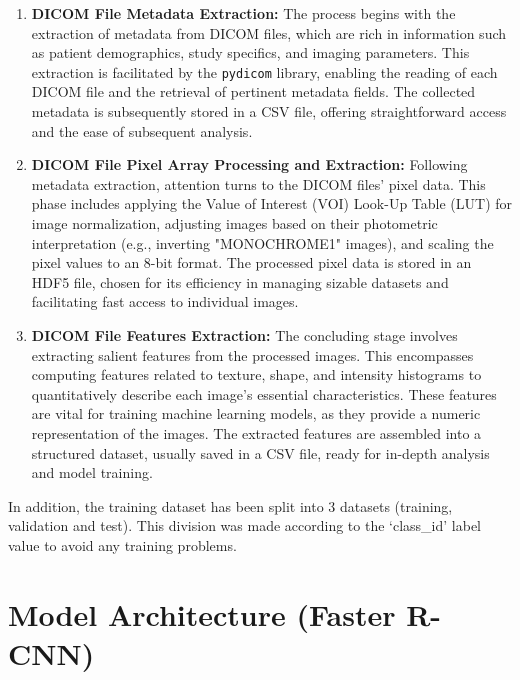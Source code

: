 \documentclass[12pt,oneside]{book} %
\begin{document}
\begin{enumerate}
    \item \textbf{DICOM File Metadata Extraction:}
          The process begins with the extraction of metadata from DICOM files, which are
          rich in information such as patient demographics, study specifics, and imaging
          parameters. This extraction is facilitated by the \texttt{pydicom} library,
          enabling the reading of each DICOM file and the retrieval of pertinent metadata
          fields. The collected metadata is subsequently stored in a CSV file, offering
          straightforward access and the ease of subsequent analysis.

    \item \textbf{DICOM File Pixel Array Processing and Extraction:}
          Following metadata extraction, attention turns to the DICOM files' pixel data.
          This phase includes applying the Value of Interest (VOI) Look-Up Table (LUT)
          for image normalization, adjusting images based on their photometric
          interpretation (e.g., inverting "MONOCHROME1" images), and scaling the pixel
          values to an 8-bit format. The processed pixel data is stored in an HDF5 file,
          chosen for its efficiency in managing sizable datasets and facilitating fast
          access to individual images.

    \item \textbf{DICOM File Features Extraction:}
          The concluding stage involves extracting salient features from the processed
          images. This encompasses computing features related to texture, shape, and
          intensity histograms to quantitatively describe each image's essential
          characteristics. These features are vital for training machine learning models,
          as they provide a numeric representation of the images. The extracted features
          are assembled into a structured dataset, usually saved in a CSV file, ready for
          in-depth analysis and model training.
\end{enumerate}

In addition, the training dataset has been split into 3 datasets (training,
validation and test). This division was made according to the `class\_id' label
value to avoid any training problems.

\newpage
\section{Model Architecture (Faster R-CNN)}
\end{document}
